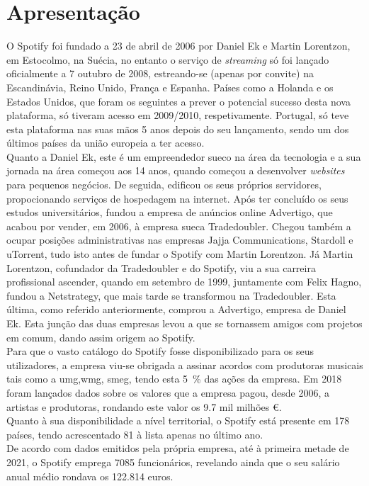 \section{Apresentação}
O Spotify foi fundado a 23 de abril de 2006 por Daniel Ek e Martin Lorentzon, em Estocolmo, na Suécia, no entanto o serviço de \textit{streaming} só foi lançado oficialmente a 7 outubro de 2008, estreando-se (apenas por convite) na Escandinávia, Reino Unido, França e Espanha. Países como a Holanda e os Estados Unidos, que foram os seguintes a prever o potencial sucesso desta nova plataforma, só tiveram acesso em 2009/2010, respetivamente. Portugal, só teve esta plataforma nas suas mãos 5 anos depois do seu lançamento, sendo um dos últimos países da união europeia a ter acesso. \\
 Quanto a Daniel Ek, este é um empreendedor sueco na área da tecnologia e a sua jornada na área começou aos 14 anos, quando começou a desenvolver \textit{websites} para pequenos negócios. De seguida, edificou os seus próprios servidores, propocionando serviços de hospedagem na internet. Após ter concluído os seus estudos universitários, fundou a empresa de anúncios online Advertigo, que acabou por vender, em 2006, à empresa sueca Tradedoubler. Chegou também a ocupar posições administrativas nas empresas Jajja Communications, Stardoll e uTorrent, tudo isto antes de fundar o Spotify com Martin Lorentzon.
 Já Martin Lorentzon, cofundador da Tradedoubler e do Spotify, viu a sua carreira profissional ascender, quando em setembro de 1999, juntamente com Felix Hagno, fundou a Netstrategy, que mais tarde se transformou na Tradedoubler. Esta última, como referido anteriormente, comprou a Advertigo, empresa de Daniel Ek. Esta junção das duas empresas levou a que se tornassem amigos com projetos em comum, dando assim origem ao Spotify.\\
 Para que o vasto catálogo do Spotify fosse disponibilizado para os seus utilizadores, a empresa viu-se obrigada a assinar acordos com produtoras musicais tais como a \ac{umg},\ac{wmg}, \ac{smeg}, tendo esta 5~\% das ações da empresa. Em 2018 foram lançados dados sobre os valores que a empresa pagou, desde 2006, a artistas e produtoras, rondando este valor os 9.7 mil milhões €.\\
 Quanto à sua disponibilidade a nível territorial, o Spotify está presente em 178 países, tendo acrescentado 81 à lista apenas no último ano.\\
 De acordo com dados emitidos pela própria empresa, até à primeira metade de 2021, o Spotify emprega 7085 funcionários, revelando ainda que o seu salário anual médio rondava os 122.814 euros.

